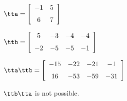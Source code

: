 {$\tta = \left[ \begin {array}{cc} -1&5\\\noalign{\medskip}6&7\end {array}
 \right] $ 

$\ttb =  \left[ \begin {array}{cccc} 5&-3&-4&-4\\\noalign{\medskip}-2&-5&-5&-1
\end {array} \right]    $}
{$\tta\ttb = \left[ \begin {array}{cccc} -15&-22&-21&-1\\\noalign{\medskip}16&-53&
-59&-31\end {array} \right]  $

$\ttb\tta$ is not possible.}

 

 

 